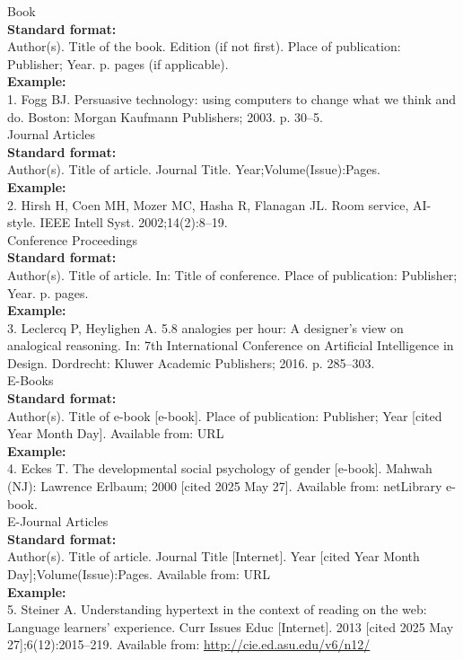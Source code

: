 \documentclass{siintec}
\begin{document}
{\siintecbibliographyfont

Book\\
\textbf{Standard format:}\\
Author(s). Title of the book. Edition (if not first). Place of publication: Publisher; Year. p. pages (if applicable).\\
\textbf{Example:}\\
1. Fogg BJ. Persuasive technology: using computers to change what we think and do. Boston: Morgan Kaufmann Publishers; 2003. p. 30–5.\\

Journal Articles\\
\textbf{Standard format:}\\
Author(s). Title of article. Journal Title. Year;Volume(Issue):Pages.\\
\textbf{Example:}\\
2. Hirsh H, Coen MH, Mozer MC, Hasha R, Flanagan JL. Room service, AI-style. IEEE Intell Syst. 2002;14(2):8–19.\\

Conference Proceedings\\
\textbf{Standard format:}\\
Author(s). Title of article. In: Title of conference. Place of publication: Publisher; Year. p. pages.\\
\textbf{Example:}\\
3. Leclercq P, Heylighen A. 5.8 analogies per hour: A designer's view on analogical reasoning. In: 7th International Conference on Artificial Intelligence in Design. Dordrecht: Kluwer Academic Publishers; 2016. p. 285–303.\\

E-Books\\
\textbf{Standard format:}\\
Author(s). Title of e-book [e-book]. Place of publication: Publisher; Year [cited Year Month Day]. Available from: URL\\
\textbf{Example:}\\
4. Eckes T. The developmental social psychology of gender [e-book]. Mahwah (NJ): Lawrence Erlbaum; 2000 [cited 2025 May 27]. Available from: netLibrary e-book.\\

E-Journal Articles\\
\textbf{Standard format:}\\
Author(s). Title of article. Journal Title [Internet]. Year [cited Year Month Day];Volume(Issue):Pages. Available from: URL\\
\textbf{Example:}\\
5. Steiner A. Understanding hypertext in the context of reading on the web: Language learners' experience. Curr Issues Educ [Internet]. 2013 [cited 2025 May 27];6(12):2015–219. Available from: \url{http://cie.ed.asu.edu/v6/n12/}\\

}
\end{document}
